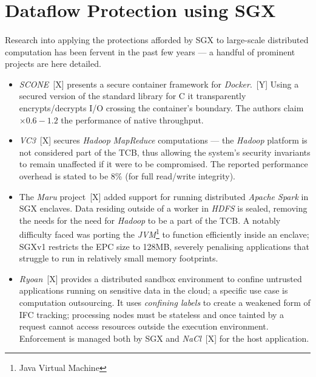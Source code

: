 \section{Dataflow Protection using SGX}
\paragraph{} Research into applying the protections afforded by SGX to large-scale distributed computation has been fervent in the past few years --- a handful of prominent projects are here detailed. 

\begin{itemize}
    \item \textit{SCONE}~[X] presents a secure container framework for \textit{Docker}.~[Y] Using a secured version of the standard library for C it transparently encrypts/decrypts I/O crossing the container's boundary. The authors claim $\times 0.6-1.2$ the performance of native throughput.
    \item \textit{VC3}~[X] secures \textit{Hadoop} \textit{MapReduce} computations --- the \textit{Hadoop} platform is not considered part of the TCB, thus allowing the system's security invariants to remain unaffected if it were to be compromised. The reported performance overhead is stated to be 8\% (for full read/write integrity).
    \item The \textit{Maru} project~[X] added support for running distributed \textit{Apache Spark} in SGX enclaves. Data residing outside of a worker in \textit{HDFS} is sealed, removing the needs for the need for \textit{Hadoop} to be a part of the TCB. A notably difficulty faced was porting the \textit{JVM}\footnote{Java Virtual Machine} to function efficiently inside an enclave; SGXv1 restricts the EPC size to 128MB, severely penalising applications that struggle to run in relatively small memory footprints.
    \item \textit{Ryoan}~[X] provides a distributed sandbox environment to confine untrusted applications running on sensitive data in the cloud; a specific use case is computation outsourcing. It uses \textit{confining labels} to create a weakened form of IFC tracking; processing nodes must be stateless and once tainted by a request cannot access resources outside the execution environment. Enforcement is managed both by SGX and \textit{NaCl}~[X] for the host application. 
\end{itemize}

